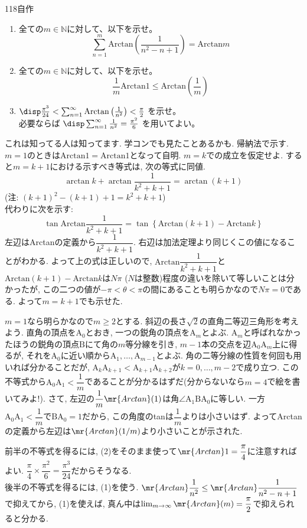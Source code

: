 \begin{prob}{118}{}{自作}
 \begin{enumerate}
  \item 全ての$m\in\mathbb{N}$に対して、以下を示せ。
	\[ \sum_{n=1}^m \mathrm{Arctan} \left(\frac{1}{n^2-n+1}\right) = \mathrm{Arctan} m \]
  \item 全ての$m\in\mathbb{N}$に対して、以下を示せ。
	\[ \frac{1}{m}\mathrm{Arctan}1 \le \mathrm{Arctan}\left(\frac{1}{m}\right) \]
  \item $\disp \frac{\pi^3}{24} < \sum_{n=1}^\infty \mathrm{Arctan}\left(\frac{1}{n^2}\right) < \frac{\pi}{2}$ を示せ。 \\
	必要ならば $\disp \sum_{n=1}^\infty \frac{1}{n^2}=\frac{\pi^2}{6}$ を用いてよい。
 \end{enumerate}
\end{prob}

 これは知ってる人は知ってます. 学コンでも見たことあるかも. 
帰納法で示す. $m=1$のときは$\mathrm{Arctan}1 = \mathrm{Arctan}1$となって自明. $m=k$での成立を仮定せよ. すると$m=k+1$における示すべき等式は, 次の等式に同値.
\[\arctan{k} + \arctan{\dfrac{1}{k^2+k+1}} = \arctan{(k+1)}\]
(注: $(k+1)^2 - (k+1) + 1 = k^2+k+1$) \\
代わりに次を示す: 
\[
\tan{\mathrm{Arctan}{\dfrac{1}{k^2+k+1}}} = \tan{\left\{ \mathrm{Arctan}{(k+1)} - \mathrm{Arctan}{k}\right\}}
\]
左辺はArctanの定義から$\dfrac{1}{k^2+k+1}$. 右辺は加法定理より同じくこの値になることがわかる. よって上の式は正しいので, $\mathrm{Arctan}{\dfrac{1}{k^2+k+1}}$と$\mathrm{Arctan}{(k+1)} - \mathrm{Arctan}{k}$は$N\pi$ ($N$は整数)程度の違いを除いて等しいことは分かったが, この二つの値が$-\pi < \theta < \pi$の間にあることも明らかなので$N\pi = 0$である. よって$m=k+1$でも示せた. 

$m=1$なら明らかなので$m\geq 2$とする.
斜辺の長さ$\sqrt{2}$の直角二等辺三角形を考えよう.  直角の頂点を$\mathrm{A}_0$とおき, 一つの鋭角の頂点を$\mathrm{A}_m$とよぶ. $\mathrm{A}_m$と呼ばれなかったほうの鋭角の頂点$\mathrm{B}$にて角の$m$等分線を引き, $m-1$本の交点を辺$\mathrm{A}_0\mathrm{A}_m$上に得るが,  それを$\mathrm{A}_0$に近い順から$\mathrm{A}_1,\dots, \mathrm{A}_{m-1}$とよぶ. 角の二等分線の性質を何回も用いれば分かることだが, $\mathrm{A}_k\mathrm{A}_{k+1} < \mathrm{A}_{k+1} \mathrm{A}_{k+2}$が$k=0,\dots, m-2$で成り立つ. この不等式から$\mathrm{A}_0 \mathrm{A}_1 < \dfrac{1}{m}$であることが分かるはずだ(分からないなら$m=4$で絵を書いてみよ!). さて, 左辺の$\dfrac{1}{m}\mr{Arctan}(1)$は角$\angle{\mathrm{A}_1\mathrm{B}\mathrm{A}_0}$に等しい. 一方$\mathrm{A}_0\mathrm{A}_1 < \dfrac{1}{m}$で$\mathrm{B}\mathrm{A}_0 = 1$だから, この角度のtanは$\dfrac{1}{m}$よりは小さいはず. よってArctanの定義から左辺は$\mr{Arctan}(1/m)$より小さいことが示された.

前半の不等式を得るには, (2)をそのまま使って$\mr{Arctan}1 = \dfrac{\pi}{4}$に注意すればよい. $\dfrac{\pi}{4}\times \dfrac{\pi^2}{6} = \dfrac{\pi^3}{24}$だからそうなる. \\
後半の不等式を得るには, (1)を使う. $\mr{Arctan}\dfrac{1}{n^2} \leq \mr{Arctan}\dfrac{1}{n^2-n+1}$で抑えてから, (1)を使えば, 真ん中は$\lim_{m\to \infty}\mr{Arctan}(m) = \dfrac{\pi}{2}$で抑えられると分かる. 


